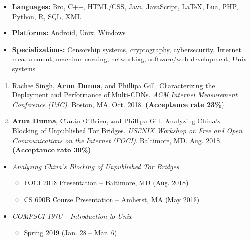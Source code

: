 
\begin{itemize}
  \item \textbf{Languages:} Bro, C++, HTML/CSS, Java, JavaScript, LaTeX, Lua, PHP, Python, R, SQL, XML
  \item \textbf{Platforms:}
  Android, Unix, Windows
  \item \textbf{Specializations:}
  Censorship systems, cryptography, cybersecurity, Internet measurement, machine learning, networking, software/web development, Unix systems

\end{itemize}


\begin{enumerate}
 \item Rachee Singh, \textbf{Arun Dunna}, and Phillipa Gill. Characterizing the Deployment and Performance of Multi-CDNs. \textit{ACM Internet Measurement Conference (IMC)}. Boston, MA. Oct. 2018. \textbf{(Acceptance rate 23\%)}
 \item \textbf{Arun Dunna}, Ciar\'an O'Brien, and Phillipa Gill. Analyzing China's Blocking of Unpublished Tor Bridges. \textit{USENIX Workshop on Free and Open Communications on the Internet (FOCI)}. Baltimore, MD. Aug. 2018. \textbf{(Acceptance rate 39\%)}
\end{enumerate}


\begin{itemize}
\item
    {\it \href{https://adunna.me/foci-2018-tor/}{Analyzing China's Blocking of Unpublished Tor Bridges}}
    \begin{itemize}
        \item FOCI 2018 Presentation -- Baltimore, MD (Aug. 2018)
        \item CS 690B Course Presentation -- Amherst, MA (May 2018)
    \end{itemize}

\end{itemize}


\begin{itemize}
\item
    {\it COMPSCI 197U - Introduction to Unix}
    \begin{itemize}
        \item \href{https://adunna.me/courses/cs197u-s19/}{Spring 2019} (Jan. 28 -- Mar. 6)
    \end{itemize}

\end{itemize}

